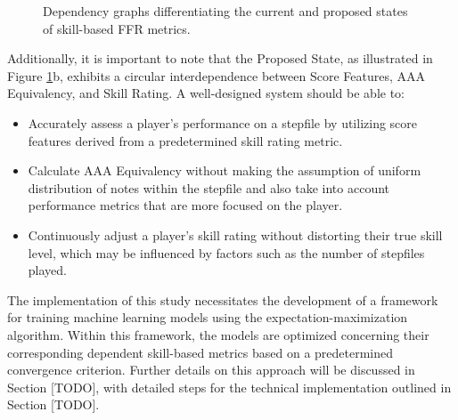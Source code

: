 \begin{center}
\begin{figure}[H]
\begin{subfloat}
{
			}       
		\end{subfloat}
		\caption{Dependency graphs differentiating the current and proposed states of skill-based FFR metrics.}
		\label{fig1}
		
	\end{figure}  
\end{center}

Additionally, it is important to note that the Proposed State, as illustrated in Figure \ref{fig1}b, exhibits a circular interdependence between Score Features, AAA Equivalency, and Skill Rating. A well-designed system should be able to:

\begin{itemize}
	\item Accurately assess a player's performance on a stepfile by utilizing score features derived from a predetermined skill rating metric.
	\item Calculate AAA Equivalency without making the assumption of uniform distribution of notes within the stepfile and also take into account performance metrics that are more focused on the player.
	\item Continuously adjust a player's skill rating without distorting their true skill level, which may be influenced by factors such as the number of stepfiles played.
\end{itemize}

The implementation of this study necessitates the development of a framework for training machine learning models using the expectation-maximization algorithm. Within this framework, the models are optimized concerning their corresponding dependent skill-based metrics based on a predetermined convergence criterion. Further details on this approach will be discussed in Section [TODO], with detailed steps for the technical implementation outlined in Section [TODO].


